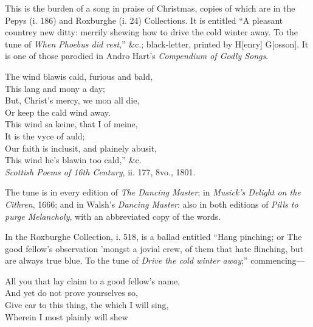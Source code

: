 This is the burden of a song in praise of Christmas, copies of which are in the
Pepys (i. 186) and Roxburghe (i. 24) Collections. It is entitled “A pleasant
countrey new ditty: merrily shewing how to drive the cold winter away. To
the tune of \textit{When Phoebus did rest},”
\&c.; black-letter, printed by H[enry]
G[osson]. It is one of those parodied in Andro Hart’s \textit{Compendium of Godly
Songs}.
\settowidth{\versewidth}{The wind blawis cald, furious and bald,}
\begin{scverse}
\begin{altverse}
The wind blawis cald, furious and bald,\\
This lang and mony a day;\\
But, Christ’s mercy, we mon all die,\\
Or keep the cald wind away.\\
This wind sa keine, that I of meine,\\
It is the vyce of auld;\\
Our faith is inclusit, and plainely abusit,\\
This wind he’s blawin too cald,” \&c.\\
\vin\vin\vin\textit{Scottish Poems of 16th Century}, ii. 177, 8vo., 1801.
\end{altverse}
\end{scverse}

The tune is in every edition of \textit{The Dancing Master}; in \textit{Musick’s Delight on
the Cithren}, 1666; and in Walsh’s \textit{Dancing Master}: also in both editions of
\textit{Pills to purge Melancholy}, with an abbreviated copy of the words.

In the Roxburghe Collection, i. 518, is a ballad entitled “Hang pinching; or
The good fellow’s observation ’mongst a jovial crew, of them that hate flinching, 
but are always true blue. To the tune of \textit{Drive the cold winter away};”
commencing—
\settowidth{\versewidth}{All you that lay claim to a good fellow’s name,}
\begin{scverse}
\begin{altverse}
All you that lay claim to a good fellow’s name,\\
And yet do not prove yourselves so,\\
Give ear to this thing, the which I will sing,\\
Wherein I most plainly will shew
\end{altverse}
\end{scverse}


